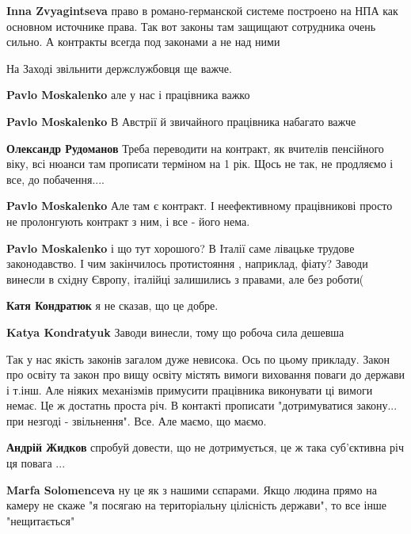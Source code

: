 \begin{itemize}
\begin{itemize}
\textbf{Inna Zvyagintseva} право в романо-германской системе построено на НПА как основном источнике права. Так вот законы там защищают сотрудника очень сильно. А контракты всегда под законами а не над ними
\end{itemize} %

На Заході звільнити держслужбовця ще важче.

\begin{itemize} %
\textbf{Pavlo Moskalenko} але у нас і працівника важко

\textbf{Pavlo Moskalenko} В Австрії й звичайного працівника набагато важче

\textbf{Олександр Рудоманов} Треба переводити на контракт, як вчителів пенсійного віку, всі нюанси там прописати терміном на 1 рік. Щось не так, не продляємо і все, до побачення....

\textbf{Pavlo Moskalenko} Але там є контракт. І неефективному працівникові просто не пролонгують контракт з ним, і все - його нема.

\textbf{Pavlo Moskalenko} і що тут хорошого? В Італії саме лівацьке трудове законодавство. І чим закінчилось протистояння , наприклад, фіату? Заводи винесли в східну Європу, італійці залишились з правами, але без роботи(

\textbf{Катя Кондратюк} я не сказав, що це добре.

\textbf{Katya Kondratyuk} Заводи винесли, тому що робоча сила дешевша
\end{itemize} %


Так у нас якість законів загалом дуже невисока. Ось по цьому прикладу. Закон
про освіту та закон про вищу освіту містять вимоги виховання поваги до держави
і т.інш. Але ніяких механізмів примусити працівника виконувати ці вимоги немає.
Це ж достатнь проста річ. В контакті прописати "дотримуватися закону... при
незгоді - звільнення". Все. Але маємо, що маємо.

\begin{itemize} %
\textbf{Андрій Жидков} спробуй довести, що не дотримується, це ж така суб'єктивна річ ця повага ...

\textbf{Marfa Solomenceva} ну це як з нашими сєпарами. Якщо людина прямо на камеру не скаже "я посягаю на територіальну цілісність держави", то все інше "нещитається"
\end{itemize} %


\end{itemize}
